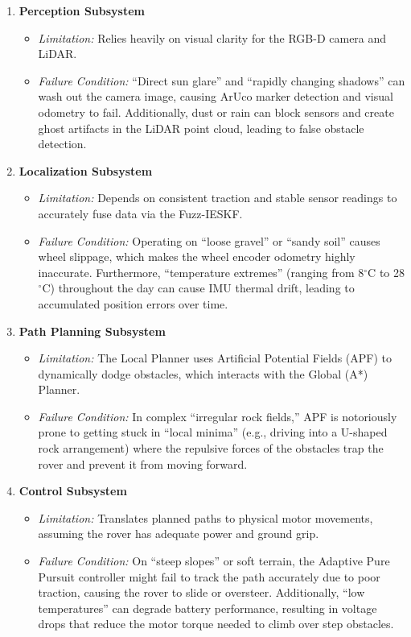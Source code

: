 \documentclass[12pt,a4paper]{article}
\begin{document}
\begin{enumerate}[leftmargin=*]
    \item \textbf{Perception Subsystem} 
    \begin{itemize}
        \item \textit{Limitation:} Relies heavily on visual clarity for the RGB-D camera and LiDAR.
        \item \textit{Failure Condition:} ``Direct sun glare'' and ``rapidly changing shadows'' can wash out the camera image, causing ArUco marker detection and visual odometry to fail. Additionally, dust or rain can block sensors and create ghost artifacts in the LiDAR point cloud, leading to false obstacle detection.
    \end{itemize}

    \item \textbf{Localization Subsystem}
    \begin{itemize}
        \item \textit{Limitation:} Depends on consistent traction and stable sensor readings to accurately fuse data via the Fuzz-IESKF.
        \item \textit{Failure Condition:} Operating on ``loose gravel'' or ``sandy soil'' causes wheel slippage, which makes the wheel encoder odometry highly inaccurate. Furthermore, ``temperature extremes'' (ranging from 8$^\circ$C to 28$^\circ$C) throughout the day can cause IMU thermal drift, leading to accumulated position errors over time.
    \end{itemize}

    \item \textbf{Path Planning Subsystem}
    \begin{itemize}
        \item \textit{Limitation:} The Local Planner uses Artificial Potential Fields (APF) to dynamically dodge obstacles, which interacts with the Global (A*) Planner.
        \item \textit{Failure Condition:} In complex ``irregular rock fields,'' APF is notoriously prone to getting stuck in ``local minima'' (e.g., driving into a U-shaped rock arrangement) where the repulsive forces of the obstacles trap the rover and prevent it from moving forward.
    \end{itemize}

    \item \textbf{Control Subsystem}
    \begin{itemize}
        \item \textit{Limitation:} Translates planned paths to physical motor movements, assuming the rover has adequate power and ground grip.
        \item \textit{Failure Condition:} On ``steep slopes'' or soft terrain, the Adaptive Pure Pursuit controller might fail to track the path accurately due to poor traction, causing the rover to slide or oversteer. Additionally, ``low temperatures'' can degrade battery performance, resulting in voltage drops that reduce the motor torque needed to climb over step obstacles.
    \end{itemize}
\end{enumerate}
\end{document}
